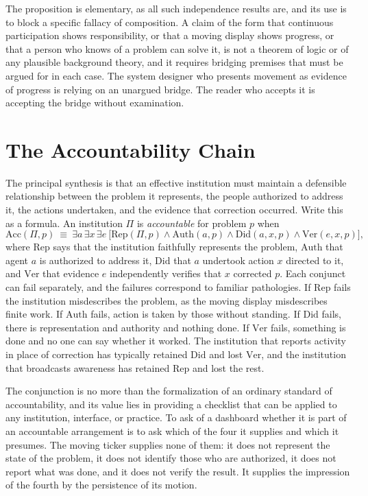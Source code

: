 \documentclass[11pt]{report}
\theoremstyle{definition}
\theoremstyle{remark}
\begin{document}
The proposition is elementary, as all such independence results are, and its use is to block a specific fallacy of composition. A claim of the form that continuous participation shows responsibility, or that a moving display shows progress, or that a person who knows of a problem can solve it, is not a theorem of logic or of any plausible background theory, and it requires bridging premises that must be argued for in each case. The system designer who presents movement as evidence of progress is relying on an unargued bridge. The reader who accepts it is accepting the bridge without examination.

\section{The Accountability Chain}

The principal synthesis is that an effective institution must maintain a defensible relationship between the problem it represents, the people authorized to address it, the actions undertaken, and the evidence that correction occurred. Write this as a formula. An institution $\Pi$ is \emph{accountable} for problem $p$ when
\[
\mathrm{Acc}(\Pi,p)\ \equiv\ \exists a\,\exists x\,\exists e\ \bigl[\mathrm{Rep}(\Pi,p)\wedge\mathrm{Auth}(a,p)\wedge\mathrm{Did}(a,x,p)\wedge\mathrm{Ver}(e,x,p)\bigr],
\]
where $\mathrm{Rep}$ says that the institution faithfully represents the problem, $\mathrm{Auth}$ that agent $a$ is authorized to address it, $\mathrm{Did}$ that $a$ undertook action $x$ directed to it, and $\mathrm{Ver}$ that evidence $e$ independently verifies that $x$ corrected $p$. Each conjunct can fail separately, and the failures correspond to familiar pathologies. If $\mathrm{Rep}$ fails the institution misdescribes the problem, as the moving display misdescribes finite work. If $\mathrm{Auth}$ fails, action is taken by those without standing. If $\mathrm{Did}$ fails, there is representation and authority and nothing done. If $\mathrm{Ver}$ fails, something is done and no one can say whether it worked. The institution that reports activity in place of correction has typically retained $\mathrm{Did}$ and lost $\mathrm{Ver}$, and the institution that broadcasts awareness has retained $\mathrm{Rep}$ and lost the rest.

The conjunction is no more than the formalization of an ordinary standard of accountability, and its value lies in providing a checklist that can be applied to any institution, interface, or practice. To ask of a dashboard whether it is part of an accountable arrangement is to ask which of the four it supplies and which it presumes. The moving ticker supplies none of them: it does not represent the state of the problem, it does not identify those who are authorized, it does not report what was done, and it does not verify the result. It supplies the impression of the fourth by the persistence of its motion.
\end{document}
